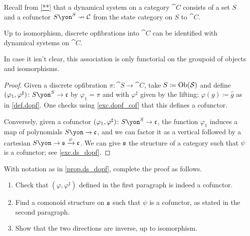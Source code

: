 \documentclass[Book-Poly]{subfiles}
\begin{document}
Recall from \cref{**} that a dynamical system on a category $\cat{C}$ consists of a set $S$ and a cofunctor $S\yon^S\cof\cat{C}$ from the state category on $S$ to $\cat{C}$.

\begin{proposition}\label{prop.ds_dopf}
Up to isomorphism, discrete opfibrations into $\cat{C}$ can be identified with dynamical systems on $\cat{C}$.
\end{proposition}
In case it isn't clear, this association is only functorial on the groupoid of objects and isomorphisms.
\begin{proof}
Given a discrete opfibration $\pi\colon\cat{S}\to\cat{C}$, take $S\coloneqq\operatorname{Ob}(\mathcal{S})$ and define $(\varphi_1,\varphi^\sharp)\colon S\yon^S\to\ema{c}$ by $\varphi_1=\pi$ and with $\varphi^\sharp$ given by the lifting: $\varphi(g)\coloneqq \hat{g}$ as in \cref{def.dopf}. One checks using \cref{exc.dopf_cof} that this defines a cofunctor. 

Conversely, given a cofunctor $(\varphi_1,\varphi^\sharp)\colon S\yon^S\to\ema{c}$, the function $\varphi_1$ induces a map of polynomials $S\yon\to\ema{c}$, and we can factor it as a vertical followed by a cartesian $S\yon\to\ema{s}\To{\psi}\ema{c}$. We can give $\mathfrak{s}$ the structure of a category such that $\psi$ is a cofunctor; see \cref{exc.ds_dopf}.
\end{proof}

\begin{exercise}\label{exc.ds_dopf}
With notation as in \cref{prop.ds_dopf}, complete the proof as follows.
\begin{enumerate}
	\item Check that $(\varphi,\varphi^\sharp)$ defined in the first paragraph is indeed a cofunctor.
	\item Find a comonoid structure on $\mathfrak{s}$ such that $\psi$ is a cofunctor, as stated in the second paragraph. 
	\item Show that the two directions are inverse, up to isomorphism.
\qedhere
\end{enumerate}
\end{exercise}
\end{document}
